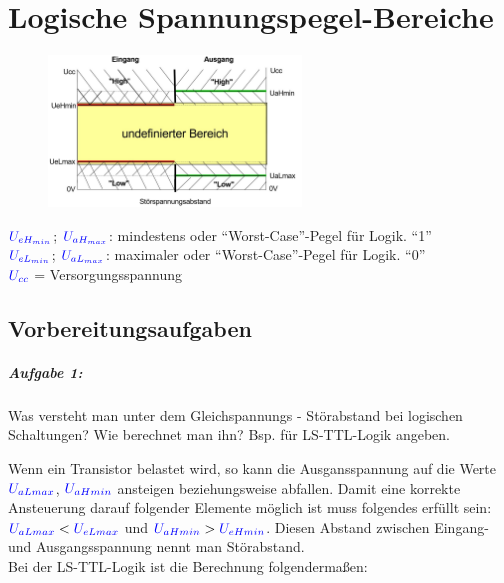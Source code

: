 \documentclass[a4paper,titlepage,parskip]{scrreprt}
\newcommand{\spannung}[1]{\textcolor{blue}{#1}}
\begin{document}
  \chapter{Logische Spannungspegel-Bereiche}

    \begin{figure}[!htbp]
      \begin{center}
        \includegraphics[width=0.6\textwidth]{./Kennlinien/1_1_Z1.jpg}
      \end{center}
    \end{figure}

    $\spannung{U_{eH_{min}}}$; $\spannung{U_{aH_{max}}}$: mindestens oder "`Worst-Case"'-Pegel für Logik. "`1"'\\
    $\spannung{U_{eL_{min}}}$; $\spannung{U_{aL_{max}}}$: maximaler oder "`Worst-Case"'-Pegel für Logik. "`0"'\\
    $\spannung{U_{cc}}$ = Versorgungsspannung\\

    \section{Vorbereitungsaufgaben}

      \paragraph{Aufgabe 1:} Was versteht man unter dem Gleichspannungs - Störabstand bei logischen Schaltungen? Wie berechnet man ihn? Bsp. für LS-TTL-Logik angeben.

        Wenn ein Transistor belastet wird, so kann die Ausgansspannung auf die Werte $\spannung{U_{aLmax}}$, $\spannung{U_{aHmin}}$ ansteigen beziehungsweise abfallen. Damit eine korrekte Ansteuerung darauf folgender Elemente möglich ist muss folgendes erfüllt sein:  $\spannung{U_{aLmax}} < \spannung{U_{eLmax}}$ und $\spannung{U_{aHmin}} > \spannung{U_{eHmin}}$. Diesen Abstand zwischen Eingang- und Ausgangsspannung nennt man Störabstand.\\
        Bei der LS-TTL-Logik ist die Berechnung folgendermaßen:
\end{document}

